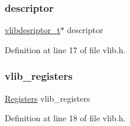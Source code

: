 \subsubsection{\texorpdfstring{descriptor}{descriptor}}
{\footnotesize\ttfamily \hyperlink{a00170_a2d9000b4fbb25c5ed2950a2d8f4921d5_a2d9000b4fbb25c5ed2950a2d8f4921d5}{vlibdesriptor\+\_\+t}$\ast$ descriptor}



Definition at line 17 of file vlib.\+h.

\mbox{\label{a00170_ae94a2076c3fb43c35d18daf9cf664e23_ae94a2076c3fb43c35d18daf9cf664e23}} 
\subsubsection{\texorpdfstring{vlib\+\_\+registers}{vlib\_registers}}
{\footnotesize\ttfamily \hyperlink{a00234}{Registers} vlib\+\_\+registers}



Definition at line 18 of file vlib.\+h.

